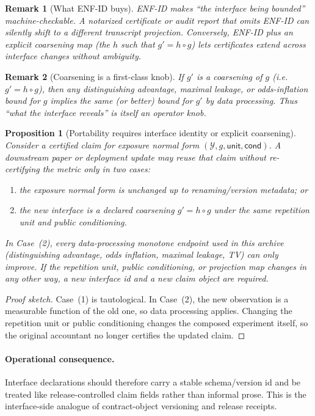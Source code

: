\documentclass[11pt]{article}
\newtheorem{remark}{Remark}
\newtheorem{proposition}{Proposition}
\begin{document}
\begin{remark}[What ENF-ID buys]
ENF-ID makes ``the interface being bounded'' machine-checkable.
A notarized certificate or audit report that omits ENF-ID can silently shift to a different transcript projection.
Conversely, ENF-ID plus an explicit \emph{coarsening map} (the $h$ such that $g'=h\circ g$) lets certificates extend across interface changes without ambiguity.
\end{remark}


\begin{remark}[Coarsening is a first-class knob]
If $g'$ is a coarsening of $g$ (i.e. $g' = h\circ g$), then any distinguishing advantage, maximal leakage, or odds-inflation bound for $g$ implies the same (or better) bound for $g'$ by data processing.
Thus ``what the interface reveals'' is itself an operator knob.
\end{remark}

\begin{proposition}[Portability requires interface identity or explicit coarsening]
\label{prop:interface-portability}
Consider a certified claim for exposure normal form $(\mathcal Y,g,\mathsf{unit},\mathsf{cond})$.
A downstream paper or deployment update may reuse that claim without re-certifying the metric only in two cases:
\begin{enumerate}[leftmargin=*]
\item the exposure normal form is unchanged up to renaming/version metadata; or
\item the new interface is a declared coarsening $g' = h\circ g$ under the same repetition unit and public conditioning.
\end{enumerate}
In Case~(2), every data-processing monotone endpoint used in this archive (distinguishing advantage, odds inflation, maximal leakage, TV) can only improve.
If the repetition unit, public conditioning, or projection map changes in any other way, a new interface id and a new claim object are required.
\end{proposition}

\begin{proof}[Proof sketch]
Case~(1) is tautological.
In Case~(2), the new observation is a measurable function of the old one, so data processing applies.
Changing the repetition unit or public conditioning changes the composed experiment itself, so the original accountant no longer certifies the updated claim.
\end{proof}

\paragraph{Operational consequence.}
Interface declarations should therefore carry a stable schema/version id and be treated like release-controlled claim fields rather than informal prose.
This is the interface-side analogue of contract-object versioning and release receipts.\cite{series:contractobjects,series:releaseproperty}
\end{document}
